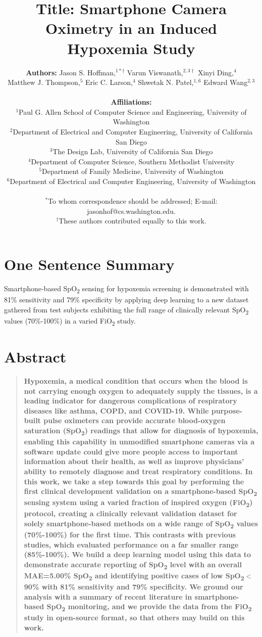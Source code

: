 \documentclass[12pt]{article}
\title{\textbf{Title: } Smartphone Camera Oximetry in an Induced Hypoxemia Study}
\author
{\textbf{Authors: } Jason S. Hoffman,$^{1 \ast \dag}$ Varun Viswanath,$^{2,3 \dag}$  Xinyi Ding,$^{4}$\\ Matthew J. Thompson,$^{5}$ Eric C. Larson,$^{4}$ Shwetak N. Patel,$^{1,6}$ Edward Wang$^{2,3}$\\
\\
\textbf{Affiliations: }\\
\normalsize{$^{1}$Paul G. Allen School of Computer Science and Engineering, University of Washington}\\
\normalsize{$^{2}$Department of Electrical and Computer Engineering, University of California San Diego}\\
\normalsize{$^{3}$The Design Lab, University of California San Diego}\\
\normalsize{$^{4}$Department of Computer Science, Southern Methodist University}\\
\normalsize{$^{5}$Department of Family Medicine, University of Washington}\\
\normalsize{$^{6}$Department of Electrical and Computer Engineering, University of Washington}\\
\\
\normalsize{$^\ast$To whom correspondence should be addressed; E-mail: jasonhof@cs.washington.edu.}\\
\normalsize{$^\dag$These authors contributed equally to this work.}
}
\date{}
\newenvironment{sciabstract}{%
\begin{quote} \bf}
{\end{quote}}
\begin{document}
 

\baselineskip16pt

\maketitle 

\section*{One Sentence Summary}
Smartphone-based SpO\textsubscript{2} sensing for hypoxemia screening is demonstrated with 81\% sensitivity and 79\% specificity by applying deep learning to a new dataset gathered from test subjects exhibiting the full range of clinically relevant SpO\textsubscript{2} values (70\%-100\%) in a varied FiO\textsubscript{2} study.

\newpage
\section*{Abstract}
\begin{sciabstract}
  Hypoxemia, a medical condition that occurs when the blood is not carrying enough oxygen to adequately supply the tissues, is a leading indicator for dangerous complications of respiratory diseases like asthma, COPD, and COVID-19. While purpose-built pulse oximeters can provide accurate blood-oxygen saturation (SpO\textsubscript{2}) readings that allow for diagnosis of hypoxemia, enabling this capability in unmodified smartphone cameras via a software update could give more people access to important information about their health, as well as improve physicians' ability to remotely diagnose and treat respiratory conditions. In this work, we take a step towards this goal by performing the first clinical development validation on a smartphone-based SpO\textsubscript{2} sensing system using a varied  fraction of inspired oxygen (FiO\textsubscript{2}) protocol, creating a clinically relevant validation dataset for solely smartphone-based methods on a wide range of SpO\textsubscript{2} values (70\%-100\%) for the first time. This contrasts with previous studies, which evaluated performance on a far smaller range (85\%-100\%). We build a deep learning model using this data to demonstrate accurate reporting of SpO\textsubscript{2} level with an overall MAE=5.00\% SpO\textsubscript{2} and identifying positive cases of low SpO\textsubscript{2}$<$90\% with 81\% sensitivity and 79\% specificity. We ground our analysis with a summary of recent literature in smartphone-based SpO\textsubscript{2} monitoring, and we provide the data from the FiO\textsubscript{2} study in open-source format, so that others may build on this work.
\end{sciabstract}
\end{document}
